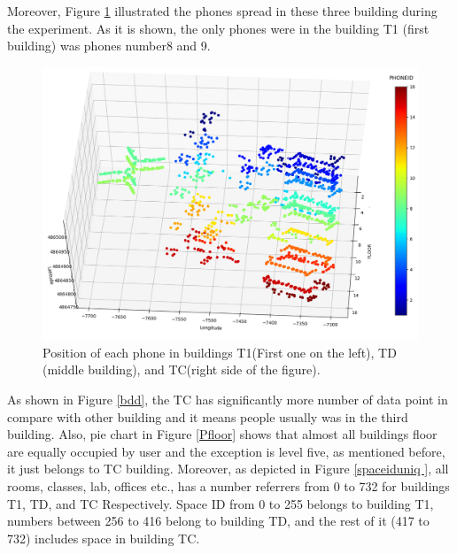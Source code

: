 Moreover, Figure \ref{phoneall} illustrated the phones spread in these three building during the experiment. As it is shown, the only phones were in the building T1 (first building) was phones number8 and 9. 


\begin{figure}
    \centering
    \includegraphics[width = 10 cm]{image/Chapters/Chapter6/LatLongUser.png}
    \caption{Position of each phone in buildings T1(First one on the left), TD (middle building), and TC(right side of the figure).}
    \label{phoneall}
\end{figure}





As shown in Figure \ref{bdd}, the TC has significantly more number of data point in compare with other building  and it means people usually was in the third building. Also, pie chart in Figure \ref{Pfloor} shows that almost all buildings floor are equally occupied by user and the exception is level five, as mentioned before, it just belongs to TC building. Moreover, as depicted in Figure \ref{spaceiduniq }, all rooms, classes, lab, offices etc., has a number referrers from 0 to 732 for  buildings T1, TD, and TC Respectively. Space ID from 0 to 255 belongs to building T1, numbers between 256 to 416 belong to building TD, and the rest of it (417 to 732) includes space in building TC.



